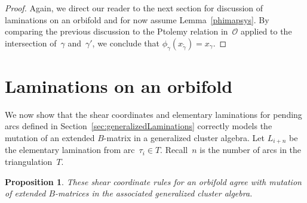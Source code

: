 \documentclass[pdftex]{sigma}%
\numberwithin{equation}{section}
\newtheorem{Proposition}[Theorem]{Proposition}
\begin{document}
\begin{proof}
Again, we direct our reader to the next section for discussion of laminations on an orbifold and for now assume Lemma~\ref{phimapsys}. By comparing the previous discussion to the Ptolemy relation in~$\mathcal{O}$ applied to the intersection of~$\gamma$ and~$\gamma'$, we conclude that $\phi_\gamma(x_{\widetilde{\gamma}}) = x_\gamma$.
\end{proof}

\section{Laminations on an orbifold}\label{sec:orbifoldLaminations}

We now show that the shear coordinates and elementary laminations for pending arcs defined in Section~\ref{sec:generalizedLaminations} correctly models the mutation of an extended $B$-matrix in a generalized cluster algebra.
Let $L_{i+n}$ be the elementary lamination from arc~$\tau_i \in T$. Recall~$n$ is the number of arcs in the triangulation~$T$.

\begin{Proposition}\label{prop:ShearCoordMutation}
These shear coordinate rules for an orbifold agree with mutation of extended $B$-matrices in the associated generalized cluster algebra.
\end{Proposition}
\end{document}
